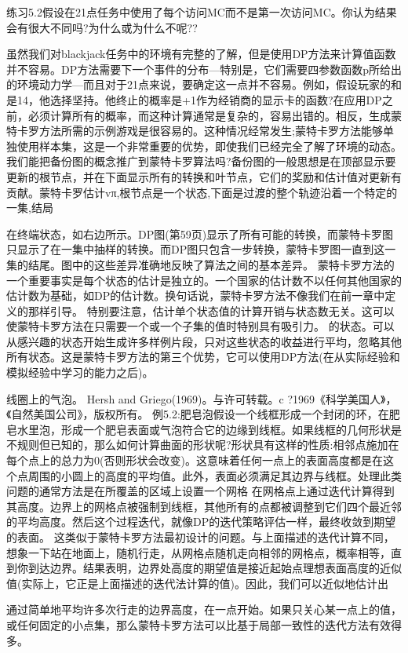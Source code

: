 练习5.2假设在21点任务中使用了每个访问MC而不是第一次访问MC。你认为结果会有很大不同吗?为什么或为什么不呢??


虽然我们对blackjack任务中的环境有完整的了解，但是使用DP方法来计算值函数并不容易。DP方法需要下一个事件的分布—特别是，它们需要四参数函数p所给出的环境动力学—而且对于21点来说，要确定这一点并不容易。例如，假设玩家的和是14，他选择坚持。他终止的概率是+1作为经销商的显示卡的函数?在应用DP之前，必须计算所有的概率，而这种计算通常是复杂的，容易出错的。相反，生成蒙特卡罗方法所需的示例游戏是很容易的。这种情况经常发生;蒙特卡罗方法能够单独使用样本集，这是一个非常重要的优势，即使我们已经完全了解了环境的动态。
我们能把备份图的概念推广到蒙特卡罗算法吗?备份图的一般思想是在顶部显示要更新的根节点，并在下面显示所有的转换和叶节点，它们的奖励和估计值对更新有贡献。蒙特卡罗估计vπ,根节点是一个状态,下面是过渡的整个轨迹沿着一个特定的一集,结局

在终端状态，如右边所示。DP图(第59页)显示了所有可能的转换，而蒙特卡罗图只显示了在一集中抽样的转换。而DP图只包含一步转换，蒙特卡罗图一直到这一集的结尾。图中的这些差异准确地反映了算法之间的基本差异。
蒙特卡罗方法的一个重要事实是每个状态的估计是独立的。一个国家的估计数不以任何其他国家的估计数为基础，如DP的估计数。换句话说，蒙特卡罗方法不像我们在前一章中定义的那样引导。
特别要注意，估计单个状态值的计算开销与状态数无关。这可以使蒙特卡罗方法在只需要一个或一个子集的值时特别具有吸引力。
的状态。可以从感兴趣的状态开始生成许多样例片段，只对这些状态的收益进行平均，忽略其他所有状态。这是蒙特卡罗方法的第三个优势，它可以使用DP方法(在从实际经验和模拟经验中学习的能力之后)。

线圈上的气泡。
Hersh and Griego(1969)。与许可转载。c ?1969《科学美国人》，《自然美国公司》，版权所有。
例5.2:肥皂泡假设一个线框形成一个封闭的环，在肥皂水里泡，形成一个肥皂表面或气泡符合它的边缘到线框。如果线框的几何形状是不规则但已知的，那么如何计算曲面的形状呢?形状具有这样的性质:相邻点施加在每个点上的总力为0(否则形状会改变)。这意味着任何一点上的表面高度都是在这个点周围的小圆上的高度的平均值。此外，表面必须满足其边界与线框。处理此类问题的通常方法是在所覆盖的区域上设置一个网格
在网格点上通过迭代计算得到其高度。边界上的网格点被强制到线框，其他所有的点都被调整到它们四个最近邻的平均高度。然后这个过程迭代，就像DP的迭代策略评估一样，最终收敛到期望的表面。
这类似于蒙特卡罗方法最初设计的问题。与上面描述的迭代计算不同，想象一下站在地面上，随机行走，从网格点随机走向相邻的网格点，概率相等，直到你到达边界。结果表明，边界处高度的期望值是接近起始点理想表面高度的近似值(实际上，它正是上面描述的迭代法计算的值)。因此，我们可以近似地估计出

通过简单地平均许多次行走的边界高度，在一点开始。如果只关心某一点上的值，或任何固定的小点集，那么蒙特卡罗方法可以比基于局部一致性的迭代方法有效得多。


